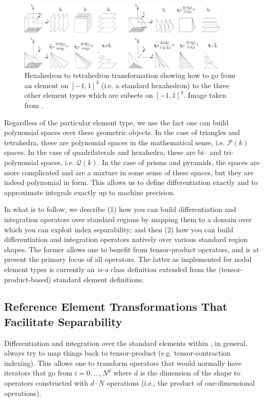 \begin{figure}[htb]
\centering
\includegraphics[width=4in]{img/LocalCoords.pdf}
\caption{Hexahedron to tetrahedron transformation showing how to go from an element on $[-1,1]^3$ (i.e. a standard hexahedron) to the three other element types which are subsets on $[-1,1]^3$.  Image taken from \cite{KaSh05}.}
\label{stdregions:3dshapes}
\end{figure}

Regardless of the particular element type, we use the fact one can build polynomial spaces over these geometric 
objects.  In the case of triangles and tetrahedra, these are polynomial spaces in the mathematical sense, i.e. $\mathcal{P}(k)$
spaces.  In the case of quadrilaterals and hexahedra, these are bi-- and tri-polynomial spaces, i.e. $\mathcal{Q}(k)$. 
In the case of prisms and pyramids, the spaces are more complicated and are a mixture in some sense of these spaces, but
they are indeed polynomial in form.  This allows us to define differentiation exactly and to approximate integrals
exactly up to machine precision.

In what is to follow, we describe (1) how you can build differentiation and integration operators over standard regions by mapping
them to a domain over which you can exploit index separability; and then (2) how you can build differentiation and integration operators
natively over various standard region shapes.  The former allows one to benefit from tensor-product operators, and is at present the 
primary focus of all {\nek} operators.  The latter as implemented for nodal element types is currently an {\em is-a} class definition 
extended from the (tensor-product-based) standard element definitions.



\subsection{Reference Element Transformations That Facilitate Separability}

Differentiation and integration over the standard elements within {\nek}, in general, always try to map things back to tensor-product
(e.g. tensor-contraction indexing).  This allows one to transform operators that would normally have iterators that go from $i=0,\ldots,N^d$ 
where $d$ is the dimension of the shape to operators constructed with $d\cdot N$ operations (i.e., the product of one-dimensional operations).

